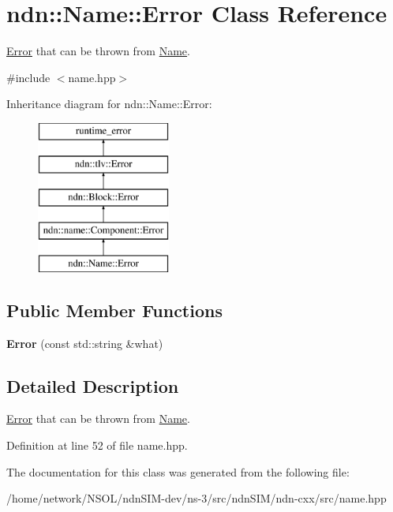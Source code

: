 \hypertarget{classndn_1_1Name_1_1Error}{}\section{ndn\+:\+:Name\+:\+:Error Class Reference}
\label{classndn_1_1Name_1_1Error}


\hyperlink{classndn_1_1Name_1_1Error}{Error} that can be thrown from \hyperlink{classndn_1_1Name}{Name}.  




{\ttfamily \#include $<$name.\+hpp$>$}

Inheritance diagram for ndn\+:\+:Name\+:\+:Error\+:\begin{figure}[H]
\begin{center}
\leavevmode
\includegraphics[height=5.000000cm]{classndn_1_1Name_1_1Error}
\end{center}
\end{figure}
\subsection*{Public Member Functions}
\begin{DoxyCompactItemize}
\item 
{\bfseries Error} (const std\+::string \&what)\hypertarget{classndn_1_1Name_1_1Error_a644a0c35630150615916787bcbfff012}{}\label{classndn_1_1Name_1_1Error_a644a0c35630150615916787bcbfff012}

\end{DoxyCompactItemize}


\subsection{Detailed Description}
\hyperlink{classndn_1_1Name_1_1Error}{Error} that can be thrown from \hyperlink{classndn_1_1Name}{Name}. 

Definition at line 52 of file name.\+hpp.



The documentation for this class was generated from the following file\+:\begin{DoxyCompactItemize}
\item 
/home/network/\+N\+S\+O\+L/ndn\+S\+I\+M-\/dev/ns-\/3/src/ndn\+S\+I\+M/ndn-\/cxx/src/name.\+hpp\end{DoxyCompactItemize}
